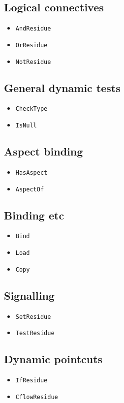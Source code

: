 \documentclass{article}
\begin{document}
\subsection{Logical connectives}
\begin{itemize}
\item \verb|AndResidue|
\item \verb|OrResidue|
\item \verb|NotResidue|
\end{itemize}

\subsection{General dynamic tests}
\begin{itemize}
\item \verb|CheckType|
\item \verb|IsNull|
\end{itemize}

\subsection{Aspect binding}
\begin{itemize}
\item \verb|HasAspect|
\item \verb|AspectOf|
\end{itemize}

\subsection{Binding etc}
\begin{itemize}
\item \verb|Bind|
\item \verb|Load|
\item \verb|Copy|
\end{itemize}

\subsection{Signalling}
\begin{itemize}
\item \verb|SetResidue|
\item \verb|TestResidue|
\end{itemize}

\subsection{Dynamic pointcuts}
\begin{itemize}
\item \verb|IfResidue|
\item \verb|CflowResidue|
\end{itemize}
\end{document}
